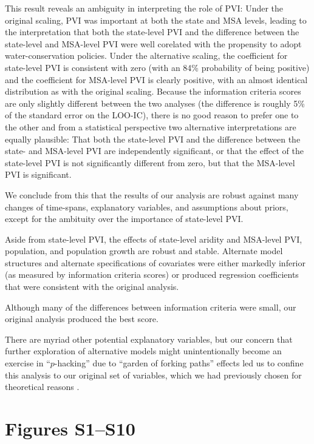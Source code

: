 \documentclass[draft]{agujournal}\usepackage{knitr}
\begin{document}
This result reveals an ambiguity in interpreting the role of PVI:
Under the original scaling, PVI was important at both the state and MSA levels,
leading to the interpretation that both the state-level PVI and the difference between
the state-level and MSA-level PVI were well corelated with the propensity to adopt
water-conservation policies. Under the alternative scaling, the
coefficient for state-level PVI is consistent with zero
(with an 84\% probability of being positive)
and the coefficient for MSA-level PVI is clearly positive, with an almost
identical distribution as with the original scaling.
Because the information criteria scores are only slightly different between
the two analyses (the difference is roughly 5\% of the standard error on the LOO-IC),
there is no good reason to prefer one to the other and from a statistical perspective
two alternative interpretations are equally plausible: That both the state-level PVI
and the difference between the state- and MSA-level PVI are independently significant,
or that the effect of the state-level PVI is not significantly different from zero,
but that the MSA-level PVI is significant.

We conclude from this that the results of our analysis are robust against
many changes of time-spans, explanatory variables, and assumptions about priors,
except for the ambituity over the importance of state-level PVI.

Aside from state-level PVI, the effects of state-level aridity and
MSA-level PVI, population, and population growth are robust and stable.
Alternate model structures and alternate specifications of covariates were either
markedly inferior (as measured by information criteria scores) or produced
regression coefficients that were consistent with the original analysis.

Although many of the differences between information criteria were small,
our original analysis produced the best score.

There are myriad other potential explanatory variables, but our concern that
further exploration of alternative models might
unintentionally become an exercise in ``$p$-hacking'' due to
``garden of forking paths'' effects \citep{gelman:forking.paths:2014}
led us to confine this analysis to our original set of variables, which
we had previously chosen for theoretical reasons \citep{hess:drought:2016}.

\section*{Figures S1--S10}
\end{document}
